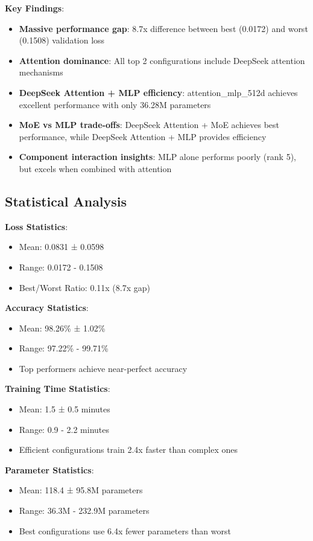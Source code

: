 \documentclass[11pt,a4paper]{article}
\begin{document}
\textbf{Key Findings}:
\begin{itemize}
    \item \textbf{Massive performance gap}: 8.7x difference between best (0.0172) and worst (0.1508) validation loss
    \item \textbf{Attention dominance}: All top 2 configurations include DeepSeek attention mechanisms
    \item \textbf{DeepSeek Attention + MLP efficiency}: attention\_mlp\_512d achieves excellent performance with only 36.28M parameters
    \item \textbf{MoE vs MLP trade-offs}: DeepSeek Attention + MoE achieves best performance, while DeepSeek Attention + MLP provides efficiency
    \item \textbf{Component interaction insights}: MLP alone performs poorly (rank 5), but excels when combined with attention
\end{itemize}

\subsection{Statistical Analysis}

\textbf{Loss Statistics}:
\begin{itemize}
    \item Mean: 0.0831 ± 0.0598
    \item Range: 0.0172 - 0.1508
    \item Best/Worst Ratio: 0.11x (8.7x gap)
\end{itemize}

\textbf{Accuracy Statistics}:
\begin{itemize}
    \item Mean: 98.26\% ± 1.02\%
    \item Range: 97.22\% - 99.71\%
    \item Top performers achieve near-perfect accuracy
\end{itemize}

\textbf{Training Time Statistics}:
\begin{itemize}
    \item Mean: 1.5 ± 0.5 minutes
    \item Range: 0.9 - 2.2 minutes
    \item Efficient configurations train 2.4x faster than complex ones
\end{itemize}

\textbf{Parameter Statistics}:
\begin{itemize}
    \item Mean: 118.4 ± 95.8M parameters
    \item Range: 36.3M - 232.9M parameters
    \item Best configurations use 6.4x fewer parameters than worst
\end{itemize}
\end{document}
